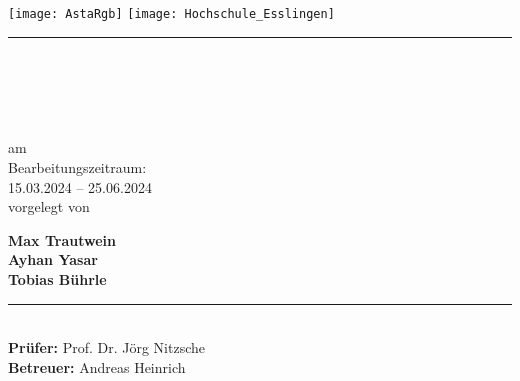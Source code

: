 \newcommand{\HRule}[2]{\noindent\rule[#1]{\linewidth}{#2}}
\newcommand{\vlinespace}[1]{\vspace*{#1\baselineskip}}
\newcommand{\titleemph}[1]{\textbf{#1}}
\begin{titlepage}
    \sffamily
    \texttt{[image: AstaRgb]}
    \hfill
    \texttt{[image: Hochschule\_Esslingen]}
    \HRule{13pt}{1pt}
    \centering
    \vlinespace{3}\\
    \workTyp\\
    \begin{Large}
        \textbf{\workTitel}\\
    \end{Large}
    \vlinespace{4}
    am \workDatum\\
    \vlinespace{1}
    Bearbeitungszeitraum:\\
    15.03.2024 -- 25.06.2024\\
    \vlinespace{4}
    vorgelegt von\\
    \begin{Large}
        \textbf{Max Trautwein}\\
        \textbf{Ayhan Yasar}\\
        \textbf{Tobias Bührle}\\
    \end{Large}
    \vlinespace{1}
    \vfill
    \raggedright{}
    \HRule{13pt}{1pt} \\
    \titleemph{Prüfer:} Prof. Dr. Jörg Nitzsche\\
    \titleemph{Betreuer:} Andreas Heinrich\\
\end{titlepage}
